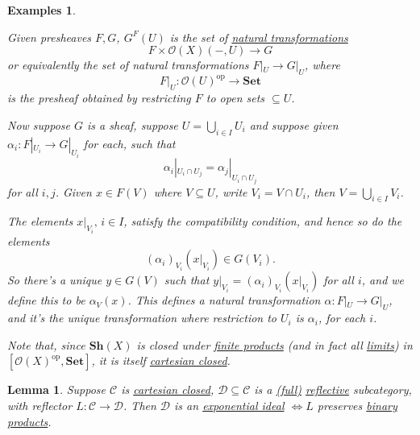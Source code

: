 \documentclass{article}
\let\to\longrightarrow
\newtheorem{nlemma}[nthm]{Lemma}
\newtheorem{nexample}[nthm]{Examples}
\begin{document}
\begin{nexample}
\begin{enumerate}[label=(\alph*)]
      Given presheaves $F,G$, $G^F(U)$ is the set of \hyperlink{def:nattrans}{natural transformations}
      \begin{equation*}
        F \times \mathcal{O}(X)(-, U) \to G
      \end{equation*}
      or equivalently the set of natural transformations $F|_U \to G|_U$, where
      \begin{equation*}F|_U: \mathcal{O}(U)^{\text{op}} \to \mathbf{Set}\end{equation*}
      is the presheaf obtained by restricting $F$ to open sets $\subseteq U$.

      Now suppose $G$ is a sheaf, suppose $U = \bigcup_{i \in I} U_i$ and suppose given $\alpha_i: F|_{U_i} \to G|_{U_i}$ for each, such that
      \begin{equation*}\alpha_i|_{U_i \cap U_j} = \alpha_j|_{U_i \cap U_j}\end{equation*}
      for all $i,j$.
      Given $x \in F(V)$ where $V \subseteq U$, write $V_i = V \cap U_i$, then $V = \bigcup_{i \in I} V_i$.

      The elements $x|_{V_i},\, i \in I$, satisfy the compatibility condition, and hence so do the elements
      \begin{equation*}(\alpha_i)_{V_i} (x|_{V_i}) \in G(V_i).\end{equation*}
      So there's a unique $y \in G(V)$ such that $y|_{V_i} = (\alpha_i)_{V_i} (x|_{V_i})$ for all $i$, and we define this to be $\alpha_V(x)$.
      This defines a natural transformation $\alpha:F|_U \to G|_U$, and it's the unique transformation where restriction to $U_i$ is $\alpha_i$, for each $i$.

      Note that, since $\mathbf{Sh}(X)$ is closed under \hyperlink{def:lprod}{finite products} (and in fact all \hyperlink{def:limit}{limits}) in $[\mathcal{O}(X)^{\text{op}}, \mathbf{Set}]$, it is itself \hyperlink{def:cc}{cartesian closed}.
  \end{enumerate}
\end{nexample}
\begin{nlemma}\label{lem:6.13}
  Suppose $\mathscr{C}$ is \hyperlink{def:cc}{cartesian closed}, $\mathscr{D} \subseteq \mathscr{C}$ is a \hyperlink{def:fulls}{(full)} \hyperlink{def:refl}{reflective} subcategory, with reflector $L: \mathscr{C} \to \mathscr{D}$.
  Then $\mathscr{D}$ is an \hyperlink{def:expIdeal}{exponential ideal} $\iff L$ preserves \hyperlink{def:lprod}{binary products}.
\end{nlemma}
\end{document}
